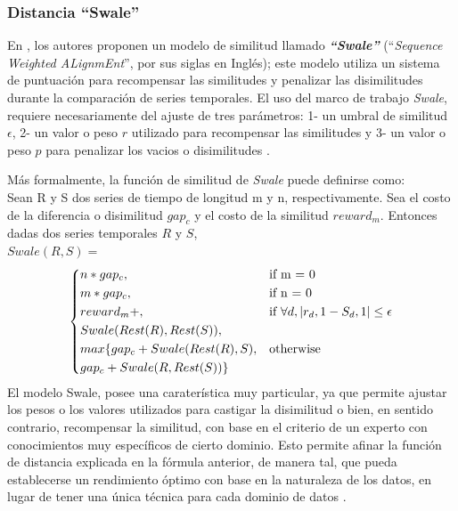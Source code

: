 \subsubsection{\textbf{Distancia \enquote{Swale}}}
En \cite{swale}, los autores proponen un modelo de similitud llamado \textbf{\textit{\enquote{Swale}}} (\enquote{\textit{Sequence Weighted ALignmEnt}}, por sus siglas en Ingl\'es); este modelo utiliza un sistema de puntuaci\'on para recompensar las similitudes y penalizar las disimilitudes durante la comparaci\'on de series temporales. El uso del marco de trabajo \textit{Swale}, requiere necesariamente del ajuste de tres par\'ametros: 1- un umbral de similitud \textbf{$\epsilon$}, 2- un valor o peso $r$ utilizado para recompensar las similitudes y 3- un valor o peso $p$ para penalizar los vacios o disimilitudes \cite{swale}.\par
M\'as formalmente, la funci\'on de similitud de \textit{Swale} puede definirse como:\\
Sean R y S dos series de tiempo de longitud m y n, respectivamente. Sea el costo de la diferencia o disimilitud $gap_c$ y el costo de la similitud $reward_m$. Entonces dadas dos series temporales $R$ y $S$,\\
$Swale(R, S) =$
\[
\begin{dcases}
    {n * gap_c},&   \text{if m = 0}\\
    {m * gap_c},&   \text{if n = 0}\\
    {reward_m + },& \text{if }{\forall d, |r_d,1 - S_d,1| \leq \epsilon}\\   
    {Swale(Rest(R), Rest(S)),}\\
    {max\{gap_c + Swale(Rest(R),S)}, & \text{otherwise}\\
    {gap_c + Swale(R, Rest(S))}\} 
\end{dcases}
\]
El modelo Swale, posee una carater\'istica muy particular, ya que permite ajustar los pesos o los valores utilizados para castigar la disimilitud o bien, en sentido contrario, recompensar la similitud, con base en el criterio de un experto con conocimientos muy espec\'ificos de cierto dominio. Esto permite afinar la funci\'on de distancia explicada en la f\'ormula anterior, de manera tal, que pueda establecerse un rendimiento \'optimo con base en la naturaleza de los datos, en lugar de tener una \'unica t\'ecnica para cada dominio de datos \cite{swale}.
